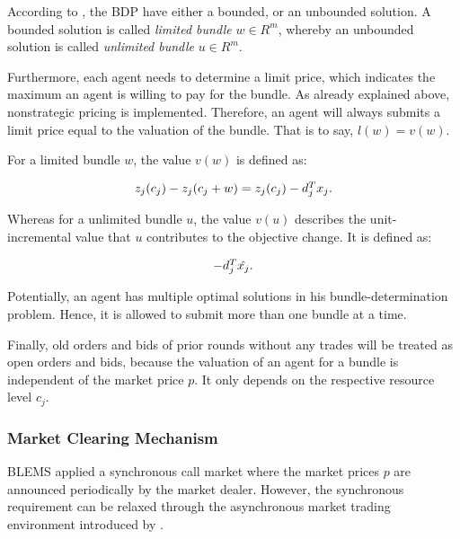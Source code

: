 According to , the BDP have either 
a bounded, or an unbounded solution. A bounded solution is called \textit{limited bundle} 
$w \in R^{m}$, whereby an unbounded solution is called \textit{unlimited bundle}
$u \in R^{m}$.

Furthermore, each agent needs to determine a limit price, which indicates
the maximum an agent is willing to pay for the bundle. 
As already explained above, nonstrategic pricing is implemented. 
Therefore, an agent will always submits a limit price equal to the valuation of the bundle. That is to say, $l(w) = v(w)$.

For a limited bundle $w$, the value $v(w)$ is defined as:

\begin{equation*}
 \begin{array}{ll@{}ll}
 z_{j}(c_{j}) - z_{j}(c_{j} + w) = z_{j}(c_{j}) - d_{j}^{T}x_{j}.
 \end{array}
\end{equation*}

Whereas for a unlimited bundle $u$, the value $v(u)$ describes the 
unit-incremental value that $u$ contributes to the objective change. It is defined
as:

\begin{equation*}
 \begin{array}{ll@{}ll}
 -d_{j}^{T}\hat{x_{j}}.
 \end{array}
\end{equation*}

Potentially, an agent has multiple optimal solutions in his bundle-determination problem. Hence, it is allowed to submit more than
one bundle at a time. 

Finally, old orders and bids of prior rounds without any trades will be treated 
as open orders and bids, because the valuation of an agent for a bundle is
independent of the market price $p$.
It only depends on the respective resource level $c_{j}$. 

\subsubsection{Market Clearing Mechanism}
\label{sec:market_clearing_mechanism}
BLEMS applied a synchronous call market where the market prices $p$ are announced periodically by the market dealer. 
However, the synchronous requirement can be relaxed through the 
asynchronous market trading environment introduced by  . 

